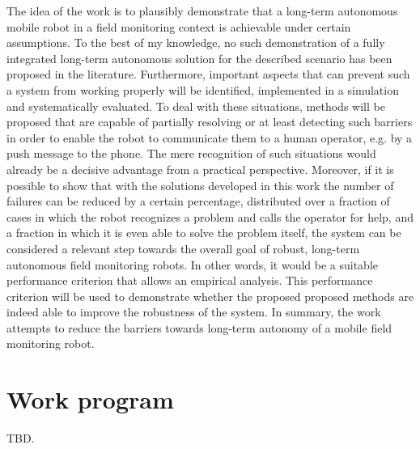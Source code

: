 \documentclass[english, master, expose, utf8]{base/thesis_KBS}
\begin{document}
The idea of the work is to plausibly demonstrate that a long-term autonomous mobile robot in a field monitoring context is achievable under certain assumptions.
To the best of my knowledge, no such demonstration of a fully integrated long-term autonomous solution for the described scenario has been proposed in the literature.
Furthermore, important aspects that can prevent such a system from working properly will be identified, implemented in a simulation and systematically evaluated.
To deal with these situations, methods will be proposed that are capable of partially resolving or at least detecting such barriers in order to enable 
the robot to communicate them to a human operator, e.g. by a push message to the phone. The mere recognition of such situations would already be a decisive
advantage from a practical perspective. Moreover, if it is possible to show that with the solutions developed in this work the number of failures can be 
reduced by a certain percentage, distributed over a fraction of cases in which the robot recognizes a problem and calls the operator for help, and a 
fraction in which it is even able to solve the problem itself, the system can be considered a relevant step towards the overall goal of robust, 
long-term autonomous field monitoring robots. In other words, it would be a suitable performance criterion that allows an empirical analysis. 
This performance criterion will be used to demonstrate whether the proposed proposed methods are indeed able to improve the robustness of the system.
In summary, the work attempts to reduce the barriers towards long-term autonomy of a  mobile field monitoring robot.

\section{Work program}

TBD.


\end{document}
